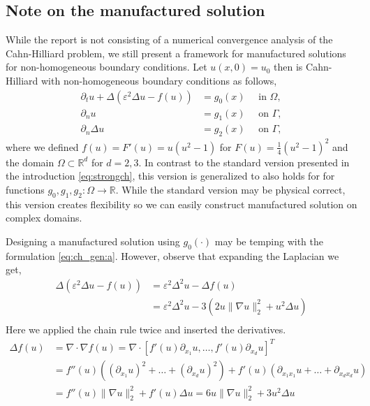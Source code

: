 \documentclass[11pt]{article}
\theoremstyle{remark}
\numberwithin{equation}{section}
\begin{document}
\subsection{Note on the manufactured solution}%
\label{sub:the_problem}

While the report is not consisting of a numerical convergence analysis of the Cahn-Hilliard problem, we still present a framework for manufactured solutions for non-homogeneous boundary conditions. Let $ u( x,0) =  u_{0}$ then is Cahn-Hilliard with
non-homogeneous boundary conditions as follows,
\begin{subequations}
    \label{eq:ch_gen}
    \begin{align}
    \label{eq:ch_gen:a}
        \partial _{t} u + \Delta  \left(  \varepsilon^2  \Delta u - f( u) \right)   &= g_{0}( x)   \quad \text{ in } \Omega,  \\
        \partial _{n} u &= g_{1}( x)  \quad \text{ on } \Gamma,  \\
        \partial _{n}    \Delta u   &= g_{2}(x)  \quad \text{ on } \Gamma,
    \end{align}
\end{subequations}
where we defined $f( u) = F'( u) =u( u^2 -1)  $ for $F( u) = \frac{1}{4}( u^{2} - 1)^{2} $ and the domain $\Omega \subset \mathbb{R} ^{d} $  for $d = 2,3$. In contrast to the standard version presented in the introduction \eqref{eq:strongch}, this
version is generalized to also holds for for functions $g_{0},g_{1},g_{2}: \Omega \to\mathbb{R}   $. While the standard version may be physical correct, this version creates flexibility so we can easily construct manufactured solution on complex domains.

    Designing a manufactured solution using $g_{0}( \cdot ) $ may be temping with the formulation \eqref{eq:ch_gen:a}. However, observe that expanding the Laplacian we get,
    \begin{equation}
    \begin{split}
        \Delta  \left(  \varepsilon^2  \Delta u - f( u) \right) & = \varepsilon^2 \Delta^2 u -  \Delta f( u) \\
                                                                                    &= \varepsilon^{2} \Delta ^2 u  - 3( 2u \| \nabla u \|_{ 2 }^{ 2 } + u^{2}  \Delta u )   \\
    \end{split}
    \end{equation}
Here we applied the chain rule twice and inserted the derivatives.
\begin{equation}
    \label{eq:nonlinear_laplace}
    \begin{split}
\Delta f( u)  &= \nabla \cdot \nabla f( u)  = \nabla \cdot  \left[ f' ( u) \partial _{x_{1}}u, \ldots, f' ( u) \partial _{x_{d}}u \right] ^{T} \\
& =  f'' ( u)( ( \partial _{x_{1}}u )^{2} + \ldots +( \partial _{x_{d}}u )^{2} ) +  f' ( u)( \partial _{x_{1} x_{1}}u + \ldots +   \partial _{x_{d} x_{d}}u ) \\
&=  f'' ( u) \| \nabla u \|_{ 2 }^{ 2 } + f' ( u)  \Delta u  = 6u \| \nabla u \|_{ 2 }^{ 2 } + 3u^{2}  \Delta u
    \end{split}
\end{equation}
\end{document}

